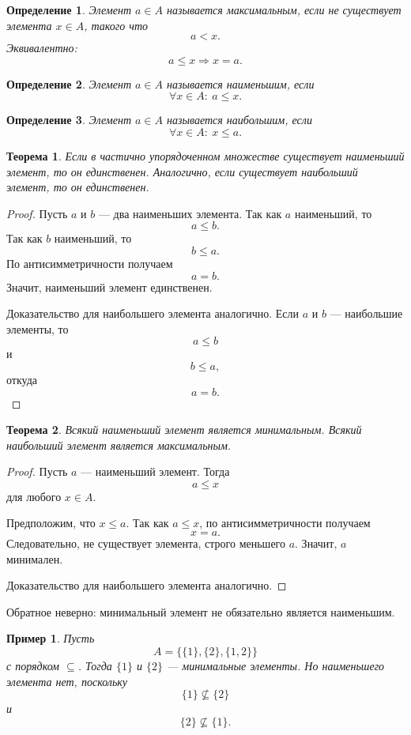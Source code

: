 \documentclass[12pt,a4paper]{article}
\newtheorem{definition}{Определение}
\newtheorem{theorem}{Теорема}
\newtheorem{example}{Пример}
\begin{document}
\begin{definition}
Элемент $a\in A$ называется \emph{максимальным}, если не существует элемента $x\in A$, такого что
\[
a<x.
\]
Эквивалентно:
\[
a\leq x\Rightarrow x=a.
\]
\end{definition}

\begin{definition}
Элемент $a\in A$ называется \emph{наименьшим}, если
\[
\forall x\in A:\ a\leq x.
\]
\end{definition}

\begin{definition}
Элемент $a\in A$ называется \emph{наибольшим}, если
\[
\forall x\in A:\ x\leq a.
\]
\end{definition}

\begin{theorem}
Если в частично упорядоченном множестве существует наименьший элемент, то он единственен.
Аналогично, если существует наибольший элемент, то он единственен.
\end{theorem}

\begin{proof}
Пусть $a$ и $b$ --- два наименьших элемента.
Так как $a$ наименьший, то
\[
a\leq b.
\]
Так как $b$ наименьший, то
\[
b\leq a.
\]
По антисимметричности получаем
\[
a=b.
\]
Значит, наименьший элемент единственен.

Доказательство для наибольшего элемента аналогично.
Если $a$ и $b$ --- наибольшие элементы, то
\[
a\leq b
\]
и
\[
b\leq a,
\]
откуда
\[
a=b.
\]
\end{proof}

\begin{theorem}
Всякий наименьший элемент является минимальным.
Всякий наибольший элемент является максимальным.
\end{theorem}

\begin{proof}
Пусть $a$ --- наименьший элемент.
Тогда
\[
a\leq x
\]
для любого $x\in A$.

Предположим, что $x\leq a$.
Так как $a\leq x$, по антисимметричности получаем
\[
x=a.
\]
Следовательно, не существует элемента, строго меньшего $a$.
Значит, $a$ минимален.

Доказательство для наибольшего элемента аналогично.
\end{proof}

Обратное неверно: минимальный элемент не обязательно является наименьшим.

\begin{example}
Пусть
\[
A=\{\{1\},\{2\},\{1,2\}\}
\]
с порядком $\subseteq$.
Тогда $\{1\}$ и $\{2\}$ --- минимальные элементы.
Но наименьшего элемента нет, поскольку
\[
\{1\}\nsubseteq \{2\}
\]
и
\[
\{2\}\nsubseteq \{1\}.
\]
\end{example}
\end{document}

